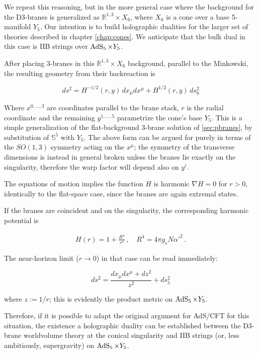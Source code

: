 We repeat this reasoning, but in the more general case where the background for the D3-branes is generalized as $\mathbb{R}^{1,3} \times X_6$, where $X_6$ is a cone over a base 5-manifold $Y_5$. Our intention is to build holographic dualities for the larger set of theories described in chapter \ref{chap:cones}. We anticipate that the bulk dual in this case is IIB strings over $\operatorname{AdS}_{5} \times Y_5$.

After placing 3-branes in this $\mathbb{R}^{1,3} \times X_6$ background, parallel to the Minkowski, the resulting geometry from their backreaction is \cite{KW_SB}

\begin{equation}
	ds^2 = H^{-1/2}(r,y) \, dx_\mu dx^\mu + H^{1/2}(r,y) \, ds_6^2 \label{warpedcone}
\end{equation}

Where $x^{0,\ldots,3}$ are coordinates parallel to the brane stack, $r$ is the radial coordinate and the remaining $y^{1,\ldots,5}$ parametrize the cone's base $Y_5$. This is a simple generalization of the flat-background 3-brane solution of \ref{sec:pbranes}, by substitution of $\mathbb{S}^5$ with $Y_5$. The above form can be argued for purely in terms of the $SO(1,3)$ symmetry acting on the $x^\mu$; the symmetry of the transverse dimensions is instead in general broken unless the branes lie exactly on the singularity, therefore the warp factor will depend also on $y^i$.

The equations of motion implies the function $H$ is harmonic $\nabla H = 0$ for $r>0$, identically to the flat-space case, since the branes are again extremal states.

If the branes are coincident and on the singularity, the corresponding harmonic potential is

\begin{align}
 H(r) = 1 + \frac{R^4}{r^4}\,,\quad R^4 = 4 \pi g_s N \alpha'^2 \,.
\end{align}

The near-horizon limit ($r\rightarrow 0$) in that case can be read immediately:

\begin{equation}
ds^2 = \frac{ dx_\mu dx^\mu + dz^2}{z^2} + ds_5^2
\end{equation}

where $z := 1/r$; this is evidently the product metric on $\operatorname{AdS}_{5} \times Y_5$.

Therefore, if it is possible to adapt the original argument for AdS/CFT for this situation, the existence a holographic duality can be established between the D3-brane worldvolume theory at the conical singularity and IIB strings (or, less ambitiously, supergravity) on $\operatorname{AdS}_{5} \times Y_5$.

